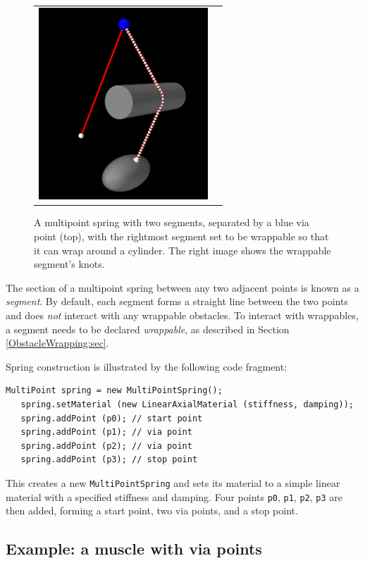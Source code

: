 \begin{figure}[ht]
\begin{center}
\begin{tabular}{cc}
       \includegraphics[width=2.5in]{images/cylinderWrappingKnots}
    \fi
  \end{tabular}
\end{center}
\caption{A multipoint spring with two segments, separated by a blue
via point (top), with the rightmost segment set to be wrappable so
that it can wrap around a cylinder. The right image shows the
wrappable segment's knots.}
\label{cylinderWrappingKnots:fig}
\end{figure}

The section of a multipoint spring between any two adjacent points is
known as a {\it segment}. By default, each segment forms a straight
line between the two points and does {\it not} interact with any
wrappable obstacles. To interact with wrappables, a segment needs to
be declared {\it wrappable}, as described in
Section \ref{ObstacleWrapping:sec}.

Spring construction is illustrated by the following code fragment:
%
\begin{lstlisting}[]
   MultiPoint spring = new MultiPointSpring();
   spring.setMaterial (new LinearAxialMaterial (stiffness, damping));
   spring.addPoint (p0); // start point
   spring.addPoint (p1); // via point
   spring.addPoint (p2); // via point
   spring.addPoint (p3); // stop point
\end{lstlisting}
%
This creates a new {\tt MultiPointSpring} and sets its material to a
simple linear material with a specified stiffness and damping.  Four points
{\tt p0}, {\tt p1}, {\tt p2}, {\tt p3} are then added, forming a start
point, two via points, and a stop point.

\subsection{Example: a muscle with via points}
\label{ViaPointMuscle:sec}

